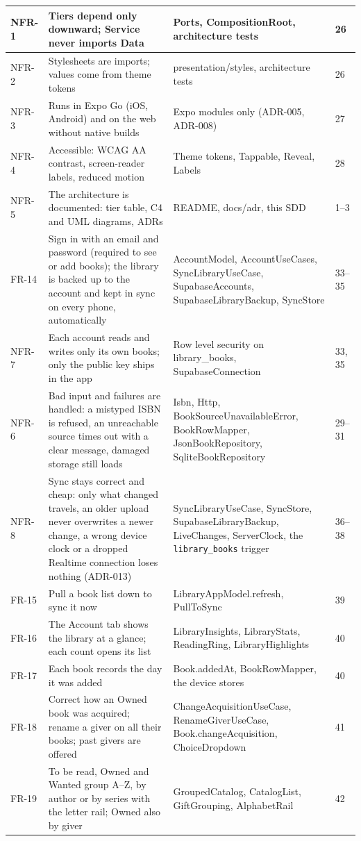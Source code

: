 \documentclass[12pt]{article}
\begin{document}
\begin{longtable}{|L{1.6cm}|L{5.2cm}|L{4.6cm}|L{2.6cm}|}
NFR-1 & Tiers depend only downward; Service never imports Data & Ports, CompositionRoot, architecture tests & 26 \\ \hline
NFR-2 & Stylesheets are imports; values come from theme tokens & presentation/styles, architecture tests & 26 \\ \hline
NFR-3 & Runs in Expo Go (iOS, Android) and on the web without native builds & Expo modules only (ADR-005, ADR-008) & 27 \\ \hline
NFR-4 & Accessible: WCAG AA contrast, screen-reader labels, reduced motion & Theme tokens, Tappable, Reveal, Labels & 28 \\ \hline
NFR-5 & The architecture is documented: tier table, C4 and UML diagrams, ADRs & README, docs/adr, this SDD & 1--3 \\ \hline
FR-14 & Sign in with an email and password (required to see or add books); the library is backed up to the account and kept in sync on every phone, automatically & AccountModel, AccountUseCases, SyncLibraryUseCase, SupabaseAccounts, SupabaseLibraryBackup, SyncStore & 33--35 \\ \hline
NFR-7 & Each account reads and writes only its own books; only the public key ships in the app & Row level security on library\_books, SupabaseConnection & 33, 35 \\ \hline
NFR-6 & Bad input and failures are handled: a mistyped ISBN is refused, an unreachable source times out with a clear message, damaged storage still loads & Isbn, Http, BookSourceUnavailableError, BookRowMapper, JsonBookRepository, SqliteBookRepository & 29--31 \\ \hline
NFR-8 & Sync stays correct and cheap: only what changed travels, an older upload never overwrites a newer change, a wrong device clock or a dropped Realtime connection loses nothing (ADR-013) & SyncLibraryUseCase, SyncStore, SupabaseLibraryBackup, LiveChanges, ServerClock, the \texttt{library\_books} trigger & 36--38 \\ \hline
FR-15 & Pull a book list down to sync it now & LibraryAppModel.refresh, PullToSync & 39 \\ \hline
FR-16 & The Account tab shows the library at a glance; each count opens its list & LibraryInsights, LibraryStats, ReadingRing, LibraryHighlights & 40 \\ \hline
FR-17 & Each book records the day it was added & Book.addedAt, BookRowMapper, the device stores & 40 \\ \hline
FR-18 & Correct how an Owned book was acquired; rename a giver on all their books; past givers are offered & ChangeAcquisitionUseCase, RenameGiverUseCase, Book.changeAcquisition, ChoiceDropdown & 41 \\ \hline
FR-19 & To be read, Owned and Wanted group A--Z, by author or by series with the letter rail; Owned also by giver & GroupedCatalog, CatalogList, GiftGrouping, AlphabetRail & 42 \\ \hline
\end{longtable}
\end{document}
